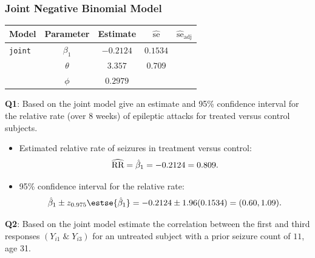 \documentclass[oneside]{book}\usepackage[]{graphicx}\usepackage[svgnames]{xcolor}
\let\exp\relax%
\newcommand{\RR}{\text{RR}}%
\begin{document}
\subsubsection*{Joint Negative Binomial Model}
\begin{table}[H]
    \centering
    \begin{tabular}{lcccc}
        Model          & Parameter   & Estimate    & $ \widehat{\text{se}} $ & $ \widehat{\text{se}}_{\text{adj}} $ \\
        \midrule
        \texttt{joint} & $ \beta_1 $ & $ -0.2124 $ & $ 0.1534 $              &                                      \\
                       & $ \theta $  & $3.357$     & $ 0.709 $                                                      \\
                       & $ \phi $    & $0.2979$                                                                     \\
        \bottomrule
    \end{tabular}
\end{table}
\begin{Example}{}
    \textbf{Q1}: Based on the joint model give an estimate and 95\% confidence interval for the
    relative rate (over 8 weeks) of epileptic attacks for treated versus control subjects.
\end{Example}
\begin{itemize}
    \item Estimated relative rate of seizures in treatment versus control:
          \[ \widehat{\RR}=\exp{\hat{\beta}_1}=\exp{-0.2124}=0.809. \]
    \item 95\% confidence interval for the relative rate:
          \[ \exp{\hat{\beta}_1\pm z_{0.975}\estse{\hat{\beta}_1}}=\exp{-0.2124\pm 1.96(0.1534)}=(0.60,1.09). \]
\end{itemize}
\begin{Example}{}
    \textbf{Q2}: Based on the joint model estimate the correlation between the first and third
    responses $(Y_{i1}\;\&\;Y_{i3})$ for an untreated subject with a prior seizure count of $11$, age 31.
\end{Example}
\end{document}

